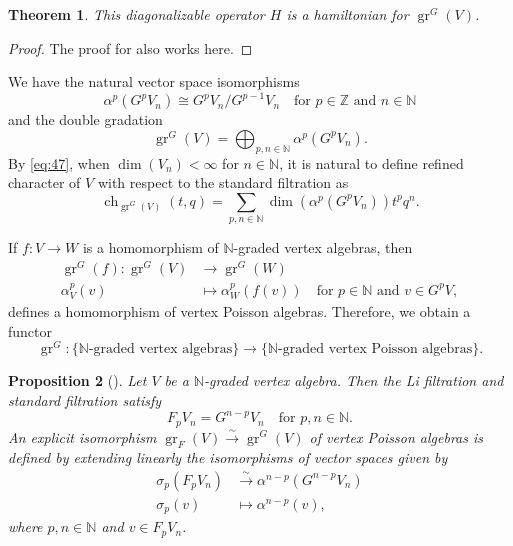 \documentclass[a4paper, 12pt, reqno]{amsart}
\newtheorem{theorem}{Theorem}[section]
\newtheorem{proposition}[theorem]{Proposition}
\theoremstyle{remark}
\numberwithin{equation}{subsection}
\DeclareMathOperator{\gr}{gr}
\DeclareMathOperator{\ch}{ch}
\begin{document}
\begin{theorem}
  \label{thr:46}
  This diagonalizable operator $H$ is a hamiltonian for $\gr^G(V)$.
\end{theorem}

\begin{proof}
  The proof for  also works here.
\end{proof}

We have the natural vector space isomorphisms
\begin{equation*}
  \alpha^p(G^pV_n) \cong G^pV_n/G^{p - 1}V_n \quad \text{for }p \in \mathbb{Z}\text{ and }n \in \mathbb{N}
\end{equation*}
and the double gradation
\begin{equation}
  \label{eq:47}
  \gr^G(V) =\bigoplus_{p, n \in \mathbb{N}}\alpha^p(G^pV_n).
\end{equation}
By \eqref{eq:47}, when $\dim(V_n) < \infty$ for $n \in \mathbb{N}$, it is natural to define refined character of $V$ with respect to the standard filtration as
\begin{equation*}
  \ch_{\gr^G(V)}(t, q) = \sum_{p, n \in \mathbb{N}}\dim(\alpha^p(G^pV_n))t^pq^n.
\end{equation*}

If $f: V \to W$ is a homomorphism of $\mathbb{N}$-graded vertex algebras, then
\begin{align*}
  \gr^G(f): \gr^G(V) &\to \gr^G(W) \\
  \alpha_V^p(v) &\mapsto \alpha_W^p(f(v)) \quad \text{for }p \in \mathbb{N}\text{ and } v \in G^pV,
\end{align*}
defines a homomorphism of vertex Poisson algebras.
Therefore, we obtain a functor
\begin{equation*}
  \gr^G: \{\text{$\mathbb{N}$-graded vertex algebras}\} \to \{\text{$\mathbb{N}$-graded vertex Poisson algebras}\}.
\end{equation*}

\begin{proposition}[{\cite[Proposition 2.6.1]{arakawa_remark_2012}}]
  \label{prp:9}
  Let $V$ be a $\mathbb{N}$-graded vertex algebra.
  Then the Li filtration and standard filtration satisfy
  \begin{equation*}
    F_pV_n = G^{n - p}V_n \quad \text{for }p, n \in \mathbb{N}.
  \end{equation*}
  An explicit isomorphism $\gr_F(V) \xrightarrow{\sim} \gr^G(V)$ of vertex Poisson algebras is defined by extending linearly the isomorphisms of vector spaces given by
  \begin{align*}
    \sigma_p(F_pV_n) &\xrightarrow{\sim} \alpha^{n - p}(G^{n - p}V_n) \\
    \sigma_p(v) &\mapsto \alpha^{n - p}(v),
  \end{align*}
  where $p, n \in \mathbb{N}$ and $v \in F_pV_n$.
\end{proposition}
\end{document}
